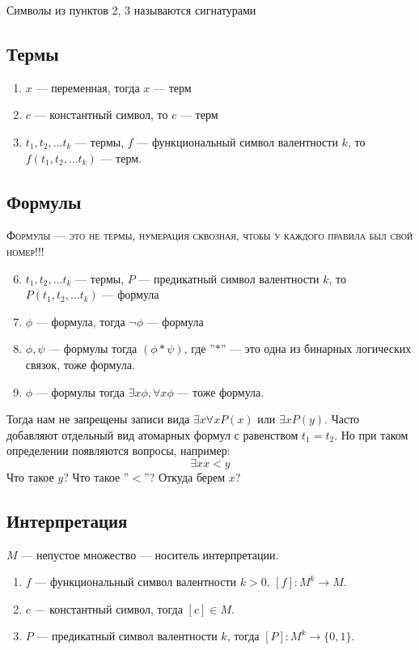 Символы из пунктов 2, 3 называются сигнатурами

\subsection{Термы}
\begin{enumerate}
    \item $x$ --- переменная, тогда $x$ --- терм
    \item $c$ --- константный символ, то $c$ --- терм
    \item $t_1, t_2, \dots t_k$ --- термы, $f$ --- функциональный символ валентности $k$, то $f(t_1, t_2, \dots t_k)$ --- терм.
\end{enumerate}
\subsection{Формулы}
\begin{center}
    \textsc{Формулы --- это не термы, нумерация сквозная, чтобы у каждого правила был свой номер!!!}
\end{center}
\begin{enumerate}
    \setcounter{enumi}{5}
    \item $t_1, t_2, \dots t_k$ --- термы, $P$ --- предикатный символ валентности $k$, то $P(t_1, t_2, \dots t_k)$ --- формула
    \item $\phi$ --- формула, тогда $\neg \phi$ --- формула
    \item $\phi, \psi$ --- формулы тогда $(\phi * \psi)$, где ''$*$'' --- это одна из бинарных логических связок, тоже формула.
    \item $\phi$ --- формулы тогда $\exists x\phi, \forall x\phi$ --- тоже формула.
\end{enumerate}
Тогда нам не запрещены записи вида $\exists x \forall xP(x)$ или $\exists x P(y)$. Часто добавляют отдельный вид атомарных формул с равенством $t_1 = t_2$. Но при таком определении появляются вопросы, например:
$$\exists x x < y$$
Что такое $y$? Что такое ''$<$''? Откуда берем $x$?

\subsection{Интерпретация}
$M$ --- непустое множество --- носитель интерпретации. 
\begin{enumerate}
    \item $f$ --- функциональный символ валентности $k > 0$. $[f]: M^k \rightarrow M$. 
    \item $c$ --- константный символ, тогда $[c] \in M$.
    \item $P$ --- предикатный символ валентности $k$, тогда $[P]: M^k \rightarrow \{0, 1\}$.
\end{enumerate}

